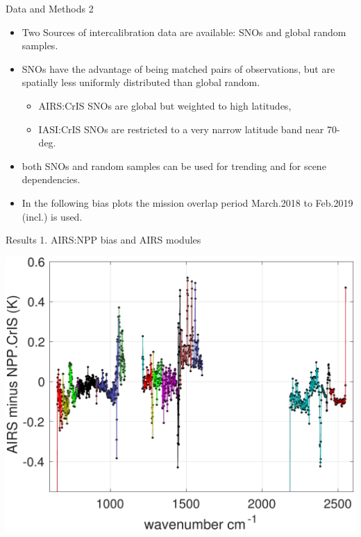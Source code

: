 \documentclass[10pt,t]{beamer}
\begin{document}
\begin{frame}{Data and Methods 2}

  \begin{itemize}
  \item Two Sources of intercalibration data are available: SNOs and global random samples.
  \item SNOs have the advantage of being matched pairs of observations, but are spatially less uniformly distributed than global random.
    \begin{itemize}
    \item AIRS:CrIS SNOs are global but weighted to high latitudes,
    \item IASI:CrIS SNOs are restricted to a very narrow latitude band near 70-deg.
    \end{itemize}
  \item both SNOs and random samples can be used for trending and for scene dependencies.
  \item In the following bias plots the mission overlap period March.2018 to Feb.2019 (incl.) is used.
    
  \end{itemize}

\end{frame}

\begin{frame}{Results 1. AIRS:NPP bias and AIRS modules}

\vspace{-0.1in}
\begin{block}{}
  \begin{center}
    \includegraphics[width=0.6\linewidth]{./Figs/2018_ac1_sno_mean_bias_vs_modules.pdf}
  \end{center}
\end{block}
    
\end{frame}
\end{document}
